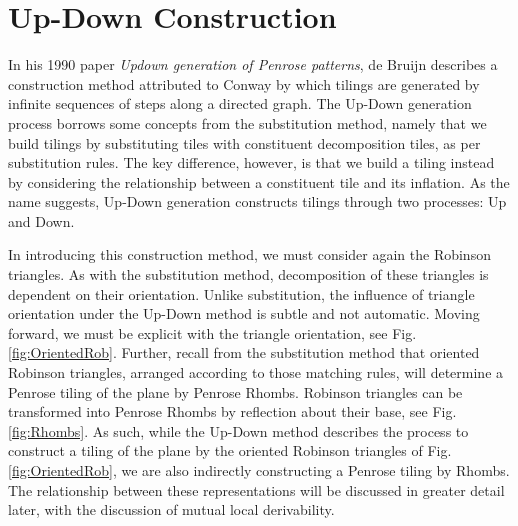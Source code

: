 \documentclass[
  oneside,
  11pt, a4paper,
  footinclude=true,
  headinclude=true,
  cleardoublepage=empty
]{scrbook}
\begin{document}
\section{Up-Down Construction} %

In his 1990 paper \textit{Updown generation of Penrose patterns}, de Bruijn describes a construction method attributed to Conway by which tilings are generated by infinite sequences of steps along a directed graph. The Up-Down generation process borrows some concepts from the substitution method, namely that we build tilings by substituting tiles with constituent decomposition tiles, as per substitution rules. The key difference, however, is that we build a tiling instead by considering the relationship between a constituent tile and its inflation. As the name suggests, Up-Down generation constructs tilings through two processes: Up and Down.

In introducing this construction method, we must consider again the Robinson triangles. As with the substitution method, decomposition of these triangles is dependent on their orientation. Unlike substitution, the influence of triangle orientation under the Up-Down method is subtle and not automatic. Moving forward, we must be explicit with the triangle orientation, see Fig.\ref{fig:OrientedRob}. Further, recall from the substitution method that oriented Robinson triangles, arranged according to those matching rules, will determine a Penrose tiling of the plane by Penrose Rhombs. Robinson triangles can be transformed into Penrose Rhombs by reflection about their base, see Fig.\ref{fig:Rhombs}. As such, while the Up-Down method describes the process to construct a tiling of the plane by the oriented Robinson triangles of Fig.\ref{fig:OrientedRob}, we are also indirectly constructing a Penrose tiling by Rhombs. The relationship between these representations will be discussed in greater detail later, with the discussion of mutual local derivability. 

 
\end{document}
